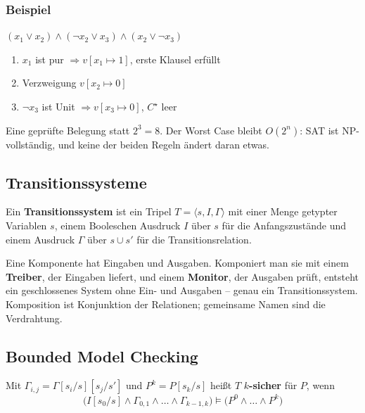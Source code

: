 \documentclass[12pt, a4paper]{article}
\begin{document}
\subsubsection*{Beispiel}

$(x_1 \vee x_2) \wedge (\neg x_2 \vee x_3) \wedge (x_2 \vee \neg x_3)$

\begin{enumerate}
  \item $x_1$ ist pur $\Rightarrow v[x_1 \mapsto 1]$, erste Klausel erfüllt
  \item Verzweigung $v[x_2 \mapsto 0]$
  \item $\neg x_3$ ist Unit $\Rightarrow v[x_3 \mapsto 0]$, $C^\star$ leer
\end{enumerate}

Eine geprüfte Belegung statt $2^3 = 8$. Der Worst Case bleibt $O(2^n)$: SAT ist
NP-vollständig, und keine der beiden Regeln ändert daran etwas.

\subsection{Transitionssysteme}

\begin{definitionbox}
Ein \textbf{Transitionssystem} ist ein Tripel $T = \langle s, I, \Gamma\rangle$ mit
einer Menge getypter Variablen $s$, einem Booleschen Ausdruck $I$ über $s$ für die
Anfangszustände und einem Ausdruck $\Gamma$ über $s \cup s'$ für die
Transitionsrelation.
\end{definitionbox}

Eine Komponente hat Eingaben und Ausgaben. Komponiert man sie mit einem
\textbf{Treiber}, der Eingaben liefert, und einem \textbf{Monitor}, der Ausgaben
prüft, entsteht ein geschlossenes System ohne Ein- und Ausgaben -- genau ein
Transitionssystem. Komposition ist Konjunktion der Relationen; gemeinsame Namen sind
die Verdrahtung.

\subsection{Bounded Model Checking}

\begin{definitionbox}
Mit $\Gamma_{i,j} = \Gamma[s_i/s][s_j/s']$ und $P^k = P[s_k/s]$ heißt $T$
\textbf{$k$-sicher} für $P$, wenn
\[
\bigl(I[s_0/s] \wedge \Gamma_{0,1} \wedge \dots \wedge \Gamma_{k-1,k}\bigr)
\models \bigl(P^0 \wedge \dots \wedge P^k\bigr)
\]
\end{definitionbox}
\end{document}
